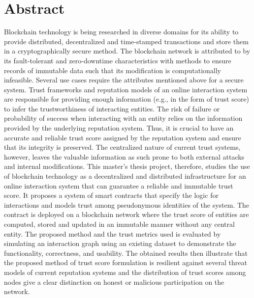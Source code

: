 \chapter*{Abstract}
Blockchain technology is being researched in diverse domains for its ability to
provide distributed, decentralized and time-stamped transactions and store them
in a cryptographically secure method. The blockchain network is attributed to
by its fault-tolerant and zero-downtime characteristics with methods to ensure
records of immutable data such that its modification is computationally
infeasible. Several use cases require the attributes mentioned above for a
secure system. Trust frameworks and reputation models of an online interaction
system are responsible for providing enough information (e.g., in the form of
trust score) to infer the trustworthiness of interacting entities. The risk of
failure or probability of success when interacting with an entity relies on the
information provided by the underlying reputation system. Thus, it is crucial
to have an accurate and reliable trust score assigned by the reputation system
and ensure that its integrity is preserved. The centralized nature of current
trust systems, however, leaves the valuable information as such prone to both
external attacks and internal modifications. This master's thesis project,
therefore, studies the use of blockchain technology as a decentralized and
distributed infrastructure for an online interaction system that can guarantee
a reliable and immutable trust score. It proposes a system of smart contracts
that specify the logic for interactions and models trust among pseudonymous
identities of the system. The contract is deployed on a blockchain network
where the trust score of entities are computed, stored and updated in an
immutable manner without any central entity. The proposed method and the trust
metrics used is evaluated by simulating an interaction graph using an existing
dataset to demonstrate the functionality, correctness, and usability. The
obtained results then illustrate that the proposed method of trust score
formulation is resilient against several threat models of current reputation
systems and the distribution of trust scores among nodes give a clear
distinction on honest or malicious participation on the network.

